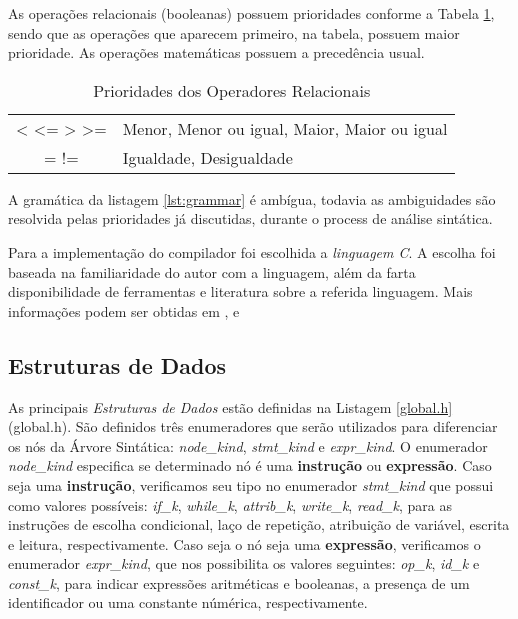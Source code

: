 As operações relacionais (booleanas) possuem prioridades conforme a Tabela
\ref{tab:prioridades}, sendo que as operações que aparecem primeiro, na
tabela, possuem maior prioridade. As operações matemáticas possuem a
precedência usual.

\begin{table}
	\begin{center}
		\begin{tabular}{c l}
			< <= > >= & Menor, Menor ou igual, Maior, Maior ou igual \\
			= !=      & Igualdade,  Desigualdade \\
		\end{tabular}
	\end{center}
	\caption{Prioridades dos Operadores Relacionais}
	\label{tab:prioridades}
\end{table}

A gramática da listagem \ref{lst:grammar} é ambígua, todavia as ambiguidades
são resolvida pelas prioridades já discutidas, durante o process de análise
sintática.

Para a implementação do compilador foi escolhida a \emph{linguagem C}. A
escolha foi baseada na familiaridade do autor com a linguagem, além da farta
disponibilidade de ferramentas e literatura sobre a referida linguagem. Mais
informações podem ser obtidas em ,  e

\subsection{Estruturas de Dados}
As principais \emph{Estruturas de Dados} estão definidas na Listagem
\ref{global.h} (global.h). São definidos três enumeradores que serão
utilizados para diferenciar os nós da Árvore Sintática: \emph{node\_kind},
\emph{stmt\_kind} e \emph{expr\_kind}. O enumerador \emph{node\_kind}
especifica se determinado nó é uma \textbf{instrução} ou \textbf{expressão}.
Caso seja uma \textbf{instrução}, verificamos seu tipo no enumerador
\emph{stmt\_kind} que possui como valores possíveis: \emph{if\_k},
\emph{while\_k}, \emph{attrib\_k}, \emph{write\_k}, \emph{read\_k}, para as
instruções de escolha condicional, laço de repetição, atribuição de variável,
escrita e leitura, respectivamente. Caso seja o nó seja uma
\textbf{expressão}, verificamos o enumerador \emph{expr\_kind}, que nos
possibilita os valores seguintes: \emph{op\_k}, \emph{id\_k} e
\emph{const\_k}, para indicar expressões aritméticas e booleanas, a presença
de um identificador ou uma constante númérica, respectivamente.

